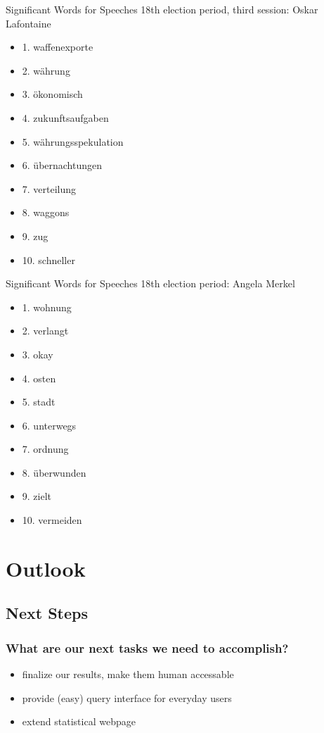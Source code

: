 \documentclass[11pt, a4paper]{beamer}
\begin{document}
\begin{frame}{Significant Words for Speeches}
18th election period, third session: Oskar Lafontaine
\begin{itemize}
\item 1. waffenexporte
\item 2. währung
\item 3. ökonomisch
\item 4. zukunftsaufgaben
\item 5. währungsspekulation
\item 6. übernachtungen
\item 7. verteilung
\item 8. waggons
\item 9. zug
\item 10. schneller
\end{itemize}
\end{frame}

\begin{frame}{Significant Words for Speeches}
18th election period: Angela Merkel
\begin{itemize}
\item 1. wohnung
\item 2. verlangt
\item 3. okay
\item 4. osten
\item 5. stadt
\item 6. unterwegs
\item 7. ordnung
\item 8. überwunden
\item 9. zielt
\item 10. vermeiden
\end{itemize}
\end{frame}

\section{Outlook}
\subsection{Next Steps}
\begin{frame}
\frametitle{What are our next tasks we need to accomplish?}
\begin{itemize}
	\item finalize our results, make them human accessable
	\item provide (easy) query interface for everyday users
	\item extend statistical webpage
\end{itemize}
\end{frame}
\end{document}
